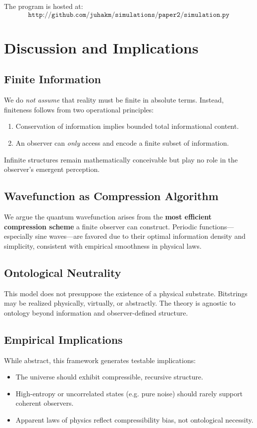 \documentclass[11pt]{article}
\begin{document}
The program is hosted at:
\[
    \texttt{http://github.com/juhakm/simulations/paper2/simulation.py}
\]



\section{Discussion and Implications}

\subsection{Finite Information}

We do \emph{not assume} that reality must be finite in absolute terms. Instead, finiteness follows from two operational principles:
\begin{enumerate}
    \item Conservation of information implies bounded total informational content.
    \item An observer can \emph{only} access and encode a finite subset of information.
\end{enumerate}
Infinite structures remain mathematically conceivable but play no role in the observer’s emergent perception.

\subsection{Wavefunction as Compression Algorithm}

We argue the quantum wavefunction arises from the \textbf{most efficient compression scheme} a finite observer can construct. Periodic functions—especially sine waves—are favored due to their optimal information density and simplicity, consistent with empirical smoothness in physical laws.

\subsection{Ontological Neutrality}

This model does not presuppose the existence of a physical substrate. Bitstrings may be realized physically, virtually, or abstractly. The theory is agnostic to ontology beyond information and observer-defined structure.

\subsection{Empirical Implications}

While abstract, this framework generates testable implications:

\begin{itemize}
    \item The universe should exhibit compressible, recursive structure.
    \item High-entropy or uncorrelated states (e.g. pure noise) should rarely support coherent observers.
    \item Apparent laws of physics reflect compressibility bias, not ontological necessity.
\end{itemize}
\end{document}
